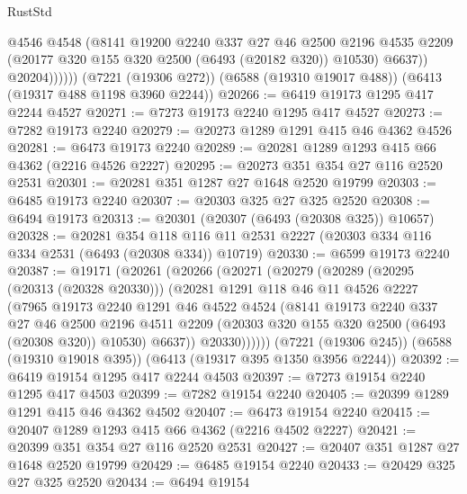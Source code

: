 \begin{lexlean}{RustStd}
\begin{coremodule}
                  @4546
                  @4548
                  (@8141
                    @19200
                    @2240
                    @337
                    @27
                    @46
                    @2500
                    @2196
                    @4535
                    @2209
                    (@20177 @320 @155 @320 @2500 (@6493 (@20182 @320)) @10530)
                    @6637))
                @20204))))))
    (@7221 (@19306 @272))
    (@6588 (@19310 @19017 @488))
    (@6413 (@19317 @488 @1198 @3960 @2244))
@20266 := @6419 @19173 @1295 @417 @2244 @4527
@20271 := @7273 @19173 @2240 @1295 @417 @4527
@20273 := @7282 @19173 @2240
@20279 := @20273 @1289 @1291 @415 @46 @4362 @4526
@20281 := @6473 @19173 @2240
@20289 := @20281 @1289 @1293 @415 @66 @4362 (@2216 @4526 @2227)
@20295 := @20273 @351 @354 @27 @116 @2520 @2531
@20301 := @20281 @351 @1287 @27 @1648 @2520 @19799
@20303 := @6485 @19173 @2240
@20307 := @20303 @325 @27 @325 @2520
@20308 := @6494 @19173
@20313 := @20301 (@20307 (@6493 (@20308 @325)) @10657)
@20328 := @20281
    @354
    @118
    @116
    @11
    @2531
    @2227
    (@20303 @334 @116 @334 @2531 (@6493 (@20308 @334)) @10719)
@20330 := @6599 @19173 @2240
@20387 := @19171
    (@20261
      (@20266
        (@20271
          (@20279
            (@20289
              (@20295 (@20313 (@20328 @20330)))
              (@20281
                @1291
                @118
                @46
                @11
                @4526
                @2227
                (@7965
                  @19173
                  @2240
                  @1291
                  @46
                  @4522
                  @4524
                  (@8141
                    @19173
                    @2240
                    @337
                    @27
                    @46
                    @2500
                    @2196
                    @4511
                    @2209
                    (@20303 @320 @155 @320 @2500 (@6493 (@20308 @320)) @10530)
                    @6637))
                @20330))))))
    (@7221 (@19306 @245))
    (@6588 (@19310 @19018 @395))
    (@6413 (@19317 @395 @1350 @3956 @2244))
@20392 := @6419 @19154 @1295 @417 @2244 @4503
@20397 := @7273 @19154 @2240 @1295 @417 @4503
@20399 := @7282 @19154 @2240
@20405 := @20399 @1289 @1291 @415 @46 @4362 @4502
@20407 := @6473 @19154 @2240
@20415 := @20407 @1289 @1293 @415 @66 @4362 (@2216 @4502 @2227)
@20421 := @20399 @351 @354 @27 @116 @2520 @2531
@20427 := @20407 @351 @1287 @27 @1648 @2520 @19799
@20429 := @6485 @19154 @2240
@20433 := @20429 @325 @27 @325 @2520
@20434 := @6494 @19154

\end{coremodule}
\end{lexlean}
